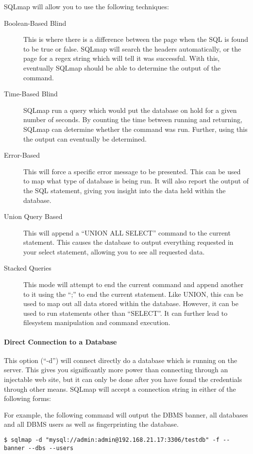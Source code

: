 			SQLmap will allow you to use the following techniques:
			\begin{description}
				\item[Boolean-Based Blind] This is where there is a difference between the page when the SQL is found to be true or false. 
					SQLmap will search the headers automatically, or the page for a regex string which will tell it was successful. 
					With this, eventually SQLmap should be able to determine the output of the command. 
				\item[Time-Based Blind] SQLmap run a query which would put the database on hold for a given number of seconds. 
					By counting the time between running and returning, SQLmap can determine whether the command was run. 
					Further, using this the output can eventually be determined. 
				\item[Error-Based] This will force a specific error message to be presented. 
					This can be used to map what type of database is being run. 
					It will also report the output of the SQL statement, giving you insight into the data held within the database. 
				\item[Union Query Based] This will append a ``UNION ALL SELECT'' command to the current statement. 
					This causes the database to output everything requested in your select statement, allowing you to see all requested data. 
				\item[Stacked Queries] This mode will attempt to end the current command and append another to it using the ``;'' to end the current statement. 
					Like UNION, this can be used to map out all data stored within the database. 
					However, it can be used to run statements other than ``SELECT''. 
					It can further lead to filesystem manipulation and command execution. 
			\end{description}
			\paragraph{Direct Connection to a Database}
				This option (``-d'') will connect directly do a database which is running on the server. 
				This gives you significantly more power than connecting through an injectable web site, but it can only be done after you have found the credentials through other means. 
				SQLmap will accept a connection string in either of the following forms:
				
				For example, the following command will output the DBMS banner, all databases and all DBMS users as well as fingerprinting the database. 
				\begin{lstlisting}[style=CLI]
					$ sqlmap -d "mysql://admin:admin@192.168.21.17:3306/testdb" -f --banner --dbs --users
				\end{lstlisting}

